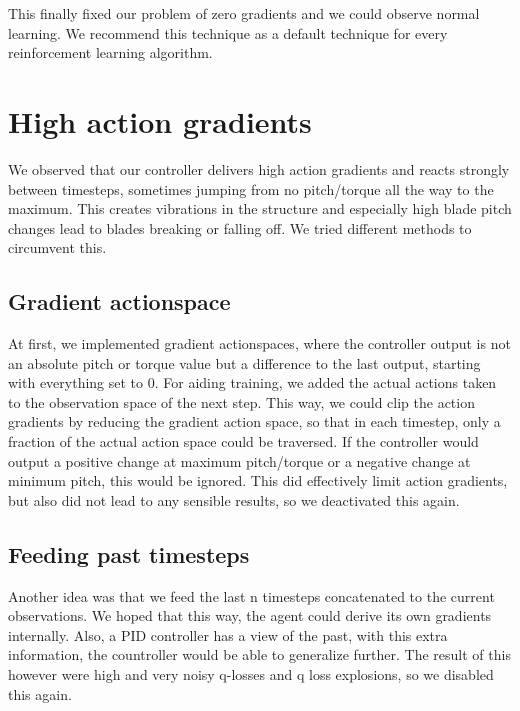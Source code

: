 \documentclass[hyperref,beleg]{cgvpub}
\begin{document}
This finally fixed our problem of zero gradients and we could observe normal learning. We recommend this technique as a default technique for every reinforcement learning algorithm. 

\section{High action gradients}

We observed that our controller delivers high action gradients and reacts strongly between timesteps, sometimes jumping from no pitch/torque all the way to the maximum. This creates vibrations in the structure and especially high blade pitch changes lead to blades breaking or falling off. We tried different methods to circumvent this.

\subsection{Gradient actionspace}

At first, we implemented gradient actionspaces, where the controller output is not an absolute pitch or torque value but a difference to the last output, starting with everything set to 0. For aiding training, we added the actual actions taken to the observation space of the next step. This way, we could clip the action gradients by reducing the gradient action space, so that in each timestep, only a fraction of the actual action space could be traversed. If the controller would output a positive change at maximum pitch/torque or a negative change at minimum pitch, this would be ignored. This did effectively limit action gradients, but also did not lead to any sensible results, so we deactivated this again.

\subsection{Feeding past timesteps}
\label{sec:feedpast}

Another idea was that we feed the last n timesteps concatenated to the current observations. We hoped that this way, the agent could derive its own gradients internally. Also, a PID controller has a view of the past, with this extra information, the countroller would be able to generalize further. The result of this however were high and very noisy q-losses and q loss explosions, so we disabled this again.
\end{document}

